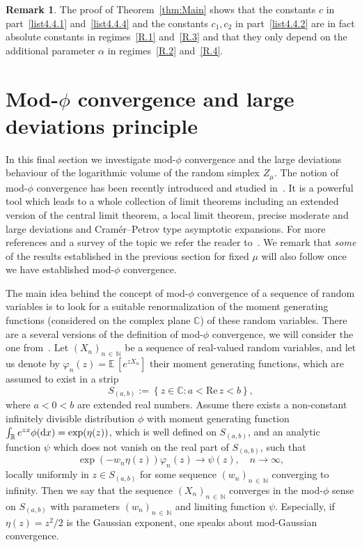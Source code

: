 \documentclass[10pt]{amsart}
\theoremstyle{definition}\newtheorem{defi}[theo]{Definition}\newtheorem{rema}[theo]{Remark}\newtheorem{exam}[theo]{Example}\newtheorem{exem}[theo]{Example}\newtheorem{nota}[theo]{Notation}
\newcommand{\R}{\mathbb{R}}
\newcommand{\EE}{\mathbb{E}\,}
\newcommand{\dd}{{\rm d}}
\renewcommand{\Re}{\text{Re}\,}
\begin{document}
\begin{rema}
The proof of Theorem~\ref{thm:Main} shows that the constants $c$ in part~\eqref{list4.4.1} and~\eqref{list4.4.4} and the constants $c_1,c_2$ in part~\eqref{list4.4.2} are in fact absolute constants in regimes~\eqref{R.1} and~\eqref{R.3} and that they only depend on the additional parameter $\alpha$ in regimes~\eqref{R.2} and~\eqref{R.4}.
\end{rema}

\section{Mod-\texorpdfstring{$\phi$}{phi} convergence and large deviations principle}\label{sec:ModPhi}

In this final section we investigate mod-$\phi$ convergence and the large deviations behaviour of the logarithmic volume of the random simplex $Z_{\mu}$. The notion of mod-$\phi$ convergence has been recently introduced and studied in~\cite{DKN15, JKN11}. It is a powerful tool which leads to a whole collection of limit theorems including an extended version of the central limit theorem, a local limit theorem, precise moderate and large deviations and Cramér--Petrov type asymptotic expansions. For more references and a survey of the topic we refer the reader to~\cite{ModPhiBook}. We remark that \emph{some} of the results established in the previous section for fixed $\mu$ will also follow once we have established mod-$\phi$ convergence.

The main idea behind the concept of mod-$\phi$ convergence of a sequence of random variables is to look for a suitable renormalization of the moment generating functions (considered on the complex plane $\mathbb{C}$) of these random variables. There are a several versions of the definition of mod-$\phi$ convergence, we will consider the one from~\cite[Definition~1.1]{ModPhiBook}. Let $(X_n)_{n\,\in\,\mathbb{N}}$ be a sequence of real-valued random variables, and let us denote by $\varphi_n(z)=\EE[e^{zX_n}]$ their moment generating functions, which are assumed to exist in a strip
\[
S_{(a,b)}:=\left\{z\in\mathbb{C}\colon a<\Re z<b\right\},
\]
where $a<0<b$ are extended real numbers. Assume there exists a non-constant infinitely divisible distribution $\phi$ with moment generating function $\int_{\R}e^{zx}\phi(\dd x)=\exp(\eta(z))$, which is well defined on $S_{(a,b)}$, and an analytic function $\psi$ which does not vanish on the real part of $S_{(a,b)}$, such that
\[
\exp\left(-w_n\eta(z)\right)\varphi_n(z)\rightarrow \psi(z),\quad n\to\infty,
\]
locally uniformly in $z\in S_{(a,b)}$ for some sequence $(w_n)_{n\,\in\,\mathbb{N}}$ converging to infinity. Then we say that the sequence $(X_n)_{n\,\in\,\mathbb{N}}$ converges in the mod-$\phi$ sense on $S_{(a,b)}$ with parameters $(w_n)_{n\,\in\,\mathbb{N}}$ and limiting function $\psi$. Especially, if $\eta(z)=z^2/2$ is the Gaussian exponent, one speaks about mod-Gaussian convergence.
\end{document}
